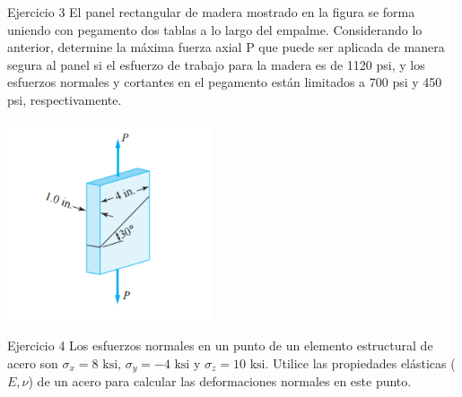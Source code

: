 \documentclass[12pt,letterpaper]{article}
\begin{document}
\begin{ejemplo}{Ejercicio 3}
El panel rectangular de madera mostrado en la figura se forma uniendo con pegamento dos tablas 
a lo largo del empalme. Considerando lo anterior, determine la máxima fuerza axial P que puede ser 
aplicada de manera segura al panel si el esfuerzo de trabajo para la madera es de 1120 psi, y 
los esfuerzos normales y cortantes en el pegamento están limitados a 700 psi y 450 psi, respectivamente.
\begin{center}
\includegraphics[width=0.45\textwidth]{img/problema_oblicuo.PNG}
\end{center}
\end{ejemplo}


\begin{ejemplo}{Ejercicio 4}
Los esfuerzos normales en un punto de un elemento estructural de acero son $\sigma_x = 8 \text{ ksi}$, 
$\sigma_y = -4 \text{ ksi}$ y $\sigma_z = 10 \text{ ksi}$. Utilice las propiedades elásticas ($E, \nu$) 
de un acero para calcular las deformaciones normales en este punto.
\end{ejemplo}
\end{document}
